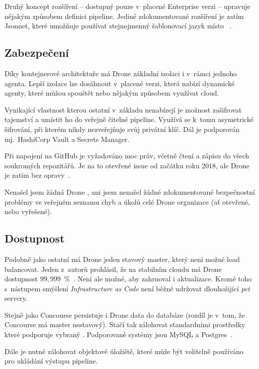         Druhý koncept rozšíření -- dostupný pouze v~placené Enterprise verzi -- upravuje nějakým způsobem definici pipeline. Jediné zdokumentované rozšíření je zatím Jsonnet, které umožňuje používat stejnojmenný šablonovací jazyk místo ~\cite{drone-jsonnet}.

    \subsection{Zabezpečení}
        Díky kontejnerové architektuře má Drone základní izolaci i v~rámci jednoho agenta. Lepší izolace lze dosáhnout v~placené verzi, která nabízí dynamické agenty, které můžou spouštět  nebo nějakým způsobem využívat cloud.

        Vynikající vlastnost kterou ostatní v~základu \CI nenabízejí je možnost zašifrovat tajemství a umístit ho do veřejně čitelné pipeline. Využívá se k~tomu asymetrické šifrování, při kterém \CI nikdy nezveřejňuje svůj privátní klíč. Dál je podporován mj.~HashiCorp Vault a  Secrets Manager.

        Při napojení na GitHub je vyžadováno moc práv, včetně čtení a zápisu do všech soukromých repozitářů. Je na to otevřené issue od začátku roku 2018, ale Drone je zatím bez opravy~\cite{drone-github-acl}.

        Nenašel jsem žádná Drone , ani jsem nenašel žádné zdokumentované bezpečnostní problémy ve veřejném seznamu chyb a úkolů celé Drone organizace (ať otevřené, nebo vyřešené).

    \subsection{Dostupnost}
        Podobně jako ostatní \CI má Drone jeden stavový master, který není možné load balancovat. Jeden z~autorů prohlásil, že na stabilním cloudu má Drone dostupnost $99,999$~\%~\cite{drone-ha}. Není ale možné, aby zahrnoval i aktualizace. Kromě toho s~nástupem smýšlení \textit{Infrastructure as Code} není běžné udržovat dlouhožijící \textit{pet} servery.

        Stejně jako Concourse persistuje i Drone data do databáze (rozdíl je v~tom, že Concourse má master nestavový). Stačí tak zálohovat standardními prostředky které podporuje vybraný . Podporované systémy jsou MySQL a Postgres~\cite{drone-database}.

        Dále je nutné zálohovat objektové úložiště, které může být volitelně používáno pro ukládání výstupu pipeline.

